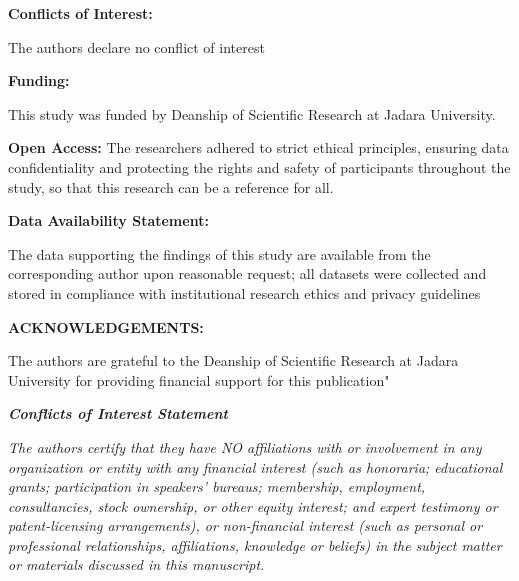 \documentclass[10pt]{NSP1}
\begin{document}
\textbf{Conflicts of Interest:}

The authors declare no conflict of interest

\textbf{Funding:}

This study was funded by Deanship of Scientific Research at Jadara University.

\textbf{Open Access:} The researchers adhered to strict ethical principles, ensuring data confidentiality and protecting the rights and safety of participants throughout the study, so that this research can be a reference for all.

\textbf{Data Availability Statement:}

The data supporting the findings of this study are available from the corresponding author upon reasonable request; all datasets were collected and stored in compliance with institutional research ethics and privacy guidelines

\textbf{ACKNOWLEDGEMENTS:}

The authors are grateful to the Deanship of Scientific Research at Jadara University for providing financial support for this publication"

\emph{\textbf{Conflicts of Interest Statement}}

\emph{The authors certify that they have NO affiliations with or involvement in any organization or entity with any financial interest (such as honoraria; educational grants; participation in speakers' bureaus; membership, employment, consultancies, stock ownership, or other equity interest; and expert testimony or patent-licensing arrangements), or non-financial interest (such as personal or professional relationships, affiliations, knowledge or beliefs) in the subject matter or materials discussed in this manuscript.}
\end{document}
